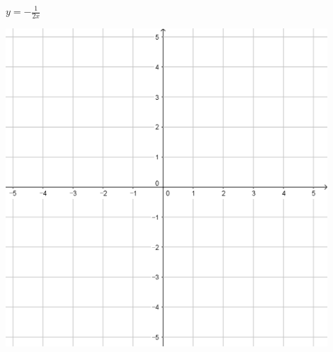 \documentclass[a4paper]{oblivoir}
\begin{document}
\begin{minipage}{0.45\textwidth}\centering
\(y=-\frac1{2x}\)
\par\bigskip\includegraphics[width=0.9\textwidth]{55}
\end{minipage}\bigskip\bigskip\par
\end{document}
